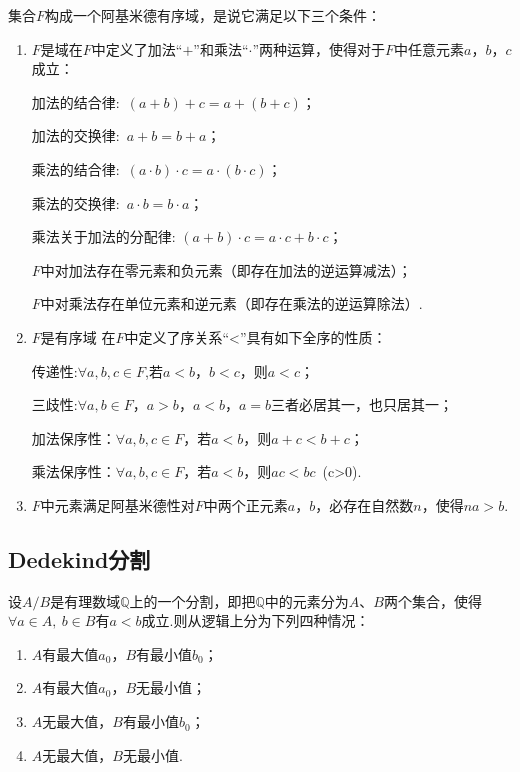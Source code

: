 \begin{definition}[阿基米德有序域]
	集合$F$构成一个{\heiti 阿基米德有序域}，是说它满足以下三个条件：
	\begin{enumerate}
		\item $F$是域\qquad 在$F$中定义了加法“$+$”和乘法“$\cdot$”两种运算，使得对于$F$中任意元素$a$，$b$，$c$成立：\par
		加法的结合律:\ $(a+b)+c=a+(b+c)$；\par
		加法的交换律:\ $a+b=b+a$；\par
		乘法的结合律:\
		$(a\cdot b)\cdot c=a\cdot (b\cdot c)$；\par
		乘法的交换律:\ $a\cdot b=b\cdot a$；\par
		乘法关于加法的分配律:
		$(a+b)\cdot c=a\cdot c+b\cdot c$；\par
		$F$中对加法存在{\heiti 零元素}和{\heiti 负元素}（即存在加法的逆运算减法）；
		
		$F$中对乘法存在{\heiti 单位元素}和{\heiti 逆元素}（即存在乘法的逆运算除法）.
		\item $F$是有序域\qquad
		在$F$中定义了{\heiti 序}关系“\textless”具有如下{\heiti 全序}的性质：\par
		传递性:$\forall a,b,c \in F$,若$a<b$，$b<c$，则$a<c$；\par
		三歧性:$\forall a,b \in F$，$a>b$，$a<b$，$a=b$三者必居其一，也只居其一；\par
		加法保序性：$\forall a,b,c \in F$，若$a<b$，则$a+c<b+c$；\par
		乘法保序性：$\forall a,b,c \in F$，若$a<b$，则$ac<bc$\ (c>0).
		\item $F$中元素满足阿基米德性\qquad 对$F$中两个正元素$a$，$b$，必存在自然数$n$，使得$na>b$.
	\end{enumerate}
\end{definition}
\subsection{Dedekind分割}
设$A/B$是有理数域$\mathbb{Q}$上的一个分割，即把$\mathbb{Q}$中的元素分为$A$、$B$两个集合，使得$\forall a \in A,\ b \in B$有$a<b$成立.则从逻辑上分为下列四种情况：
\begin{enumerate}
	\item $A$有最大值$a_0$，$B$有最小值$b_0$；
	\item $A$有最大值$a_0$，$B$无最小值；
	\item $A$无最大值，$B$有最小值$b_0$；
	\item $A$无最大值，$B$无最小值.
\end{enumerate}	

